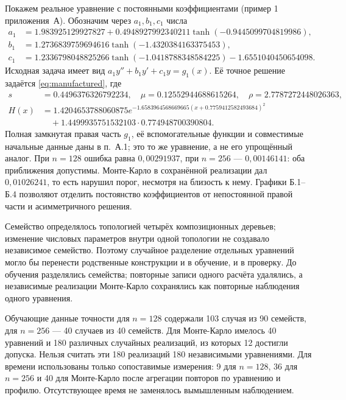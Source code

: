 \clearpage
Покажем реальное уравнение с постоянными коэффициентами (пример 1 приложения~А). Обозначим через $a_1,b_1,c_1$ числа
\begin{equation}\label{eq:realconstant}
\begin{aligned}
a_1&=1.983925129927827+0.4948927992340211\tanh(-0.9445099704819986),\\
b_1&=1.2736839759694616\tanh(-1.4320384163375453),\\
c_1&=1.2336798048825266\tanh(-1.0418788348584225)-1.6551040450654098.
\end{aligned}
\end{equation}
Исходная задача имеет вид $a_1y''+b_1y'+c_1y=g_1(x)$. Её точное решение задаётся \eqref{eq:manufactured}, где
\begin{equation}\label{eq:realexact}
\begin{aligned}
s&=0.4496376326792234,\quad \mu=0.12552944688615264,\quad \rho=2.7787272448026363,\\
H(x)&=1.4204653788060875e^{-1.6583964568669665(x+0.7759412582493684)^2}\\
&\quad+1.4499935751532103\cdot0.774948700390804.
\end{aligned}
\end{equation}
Полная замкнутая правая часть $g_1$, её вспомогательные функции и совместимые начальные данные даны в п.~А.1; это то же уравнение, а не его упрощённый аналог. При $n=128$ ошибка равна $0{,}00291937$, при $n=256$ --- $0{,}00146141$: оба приближения допустимы. Монте-Карло в сохранённой реализации дал $0{,}01026241$, то есть нарушил порог, несмотря на близость к нему. Графики Б.1--Б.4 позволяют отделить постоянство коэффициентов от непостоянной правой части и асимметричного решения.

Семейство определялось топологией четырёх композиционных деревьев; изменение числовых параметров внутри одной топологии не создавало независимое семейство. Поэтому случайное разделение отдельных уравнений могло бы перенести родственные конструкции и в обучение, и в проверку. До обучения разделялись семейства; повторные записи одного расчёта удалялись, а независимые реализации Монте-Карло сохранялись как повторные наблюдения одного уравнения.

Обучающие данные точности для $n=128$ содержали 103 случая из 90 семейств, для $n=256$ --- 40 случаев из 40 семейств. Для Монте-Карло имелось 40 уравнений и 180 различных случайных реализаций, из которых 12 достигли допуска. Нельзя считать эти 180 реализаций 180 независимыми уравнениями. Для времени использованы только сопоставимые измерения: 9 для $n=128$, 36 для $n=256$ и 40 для Монте-Карло после агрегации повторов по уравнению и профилю. Отсутствующее время не заменялось вымышленным наблюдением.

